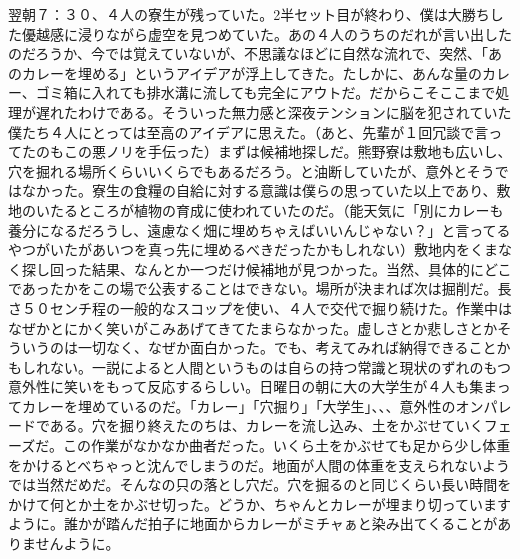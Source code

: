 翌朝７：３０、４人の寮生が残っていた。2半セット目が終わり、僕は大勝ちした優越感に浸りながら虚空を見つめていた。あの４人のうちのだれが言い出したのだろうか、今では覚えていないが、不思議なほどに自然な流れで、突然、「あのカレーを埋める」というアイデアが浮上してきた。たしかに、あんな量のカレー、ゴミ箱に入れても排水溝に流しても完全にアウトだ。だからこそここまで処理が遅れたわけである。そういった無力感と深夜テンションに脳を犯されていた僕たち４人にとっては至高のアイデアに思えた。（あと、先輩が１回冗談で言ってたのもこの悪ノリを手伝った）まずは候補地探しだ。熊野寮は敷地も広いし、穴を掘れる場所くらいいくらでもあるだろう。と油断していたが、意外とそうではなかった。寮生の食糧の自給に対する意識は僕らの思っていた以上であり、敷地のいたるところが植物の育成に使われていたのだ。（能天気に「別にカレーも養分になるだろうし、遠慮なく畑に埋めちゃえばいいんじゃない？」と言ってるやつがいたがあいつを真っ先に埋めるべきだったかもしれない）敷地内をくまなく探し回った結果、なんとか一つだけ候補地が見つかった。当然、具体的にどこであったかをこの場で公表することはできない。場所が決まれば次は掘削だ。長さ５０センチ程の一般的なスコップを使い、４人で交代で掘り続けた。作業中はなぜかとにかく笑いがこみあげてきてたまらなかった。虚しさとか悲しさとかそういうのは一切なく、なぜか面白かった。でも、考えてみれば納得できることかもしれない。一説によると人間というものは自らの持つ常識と現状のずれのもつ意外性に笑いをもって反応するらしい。日曜日の朝に大の大学生が４人も集まってカレーを埋めているのだ。「カレー」「穴掘り」「大学生」、、、意外性のオンパレードである。穴を掘り終えたのちは、カレーを流し込み、土をかぶせていくフェーズだ。この作業がなかなか曲者だった。いくら土をかぶせても足から少し体重をかけるとべちゃっと沈んでしまうのだ。地面が人間の体重を支えられないようでは当然だめだ。そんなの只の落とし穴だ。穴を掘るのと同じくらい長い時間をかけて何とか土をかぶせ切った。どうか、ちゃんとカレーが埋まり切っていますように。誰かが踏んだ拍子に地面からカレーがミチャぁと染み出てくることがありませんように。

